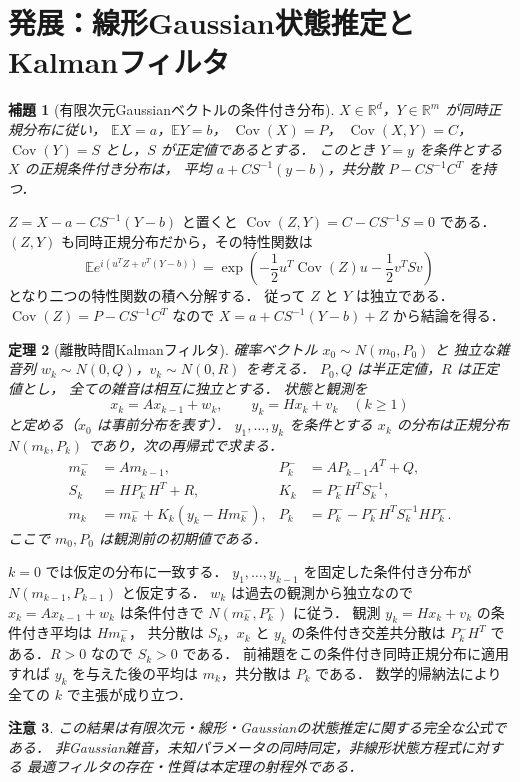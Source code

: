 \documentclass[a5paper,10pt,onecolumn]{jsarticle}
\makeatletter
\theoremstyle{mathnotetheorem}
\newtheorem{theorem}{定理}[section]
\newtheorem{lemma}[theorem]{補題}
\newtheorem{remark}[theorem]{注意}
\renewcommand{\proofname}{証明}
\renewenvironment{proof}[1][\proofname]{%
  \par\pushQED{\qed}\normalfont\topsep4\p@\@plus2\p@\relax
  \trivlist\item[\hskip\labelsep\bfseries #1]\ignorespaces
}{\popQED\endtrivlist\@endpefalse}
\makeatother
\begin{document}
\section{発展：線形Gaussian状態推定とKalmanフィルタ}
\begin{lemma}[有限次元Gaussianベクトルの条件付き分布]
$X\in\mathbb R^d$，$Y\in\mathbb R^m$ が同時正規分布に従い，
$\mathbb EX=a$，$\mathbb EY=b$，
$\operatorname{Cov}(X)=P$，
$\operatorname{Cov}(X,Y)=C$，
$\operatorname{Cov}(Y)=S$ とし，$S$ が正定値であるとする．
このとき $Y=y$ を条件とする $X$ の正規条件付き分布は，
平均 $a+CS^{-1}(y-b)$，共分散 $P-CS^{-1}C^T$ を持つ．
\end{lemma}
\begin{proof}
$Z=X-a-CS^{-1}(Y-b)$ と置くと
$\operatorname{Cov}(Z,Y)=C-CS^{-1}S=0$ である．
$(Z,Y)$ も同時正規分布だから，その特性関数は
\[
 \mathbb E e^{i(u^TZ+v^T(Y-b))}
 =\exp\!\left(-\frac12u^T\operatorname{Cov}(Z)u
                 -\frac12v^TSv\right)
\]
となり二つの特性関数の積へ分解する．
従って $Z$ と $Y$ は独立である．
$\operatorname{Cov}(Z)=P-CS^{-1}C^T$ なので
$X=a+CS^{-1}(Y-b)+Z$ から結論を得る．
\end{proof}
\begin{theorem}[離散時間Kalmanフィルタ]
確率ベクトル $x_0\sim N(m_0,P_0)$ と
独立な雑音列 $w_k\sim N(0,Q)$，$v_k\sim N(0,R)$ を考える．
$P_0,Q$ は半正定値，$R$ は正定値とし，
全ての雑音は相互に独立とする．
状態と観測を
\[
 x_k=Ax_{k-1}+w_k,\qquad y_k=Hx_k+v_k
 \quad(k\ge1)
\]
と定める（$x_0$ は事前分布を表す）．
$y_1,\ldots,y_k$ を条件とする $x_k$ の分布は正規分布
$N(m_k,P_k)$ であり，次の再帰式で求まる．
\begin{align*}
 m_k^-&=Am_{k-1},&P_k^-&=AP_{k-1}A^T+Q,\\
 S_k&=HP_k^-H^T+R,&K_k&=P_k^-H^TS_k^{-1},\\
 m_k&=m_k^-+K_k(y_k-Hm_k^-),
 &P_k&=P_k^- -P_k^-H^TS_k^{-1}HP_k^-.
\end{align*}
ここで $m_0,P_0$ は観測前の初期値である．
\end{theorem}
\begin{proof}
$k=0$ では仮定の分布に一致する．
$y_1,\ldots,y_{k-1}$ を固定した条件付き分布が
$N(m_{k-1},P_{k-1})$ と仮定する．
$w_k$ は過去の観測から独立なので
$x_k=Ax_{k-1}+w_k$ は条件付きで
$N(m_k^-,P_k^-)$ に従う．
観測 $y_k=Hx_k+v_k$ の条件付き平均は $Hm_k^-$，
共分散は $S_k$，$x_k$ と $y_k$ の条件付き交差共分散は
$P_k^-H^T$ である．$R>0$ なので $S_k>0$ である．
前補題をこの条件付き同時正規分布に適用すれば
$y_k$ を与えた後の平均は $m_k$，共分散は $P_k$ である．
数学的帰納法により全ての $k$ で主張が成り立つ．
\end{proof}
\begin{remark}
この結果は有限次元・線形・Gaussianの状態推定に関する完全な公式である．
非Gaussian雑音，未知パラメータの同時同定，非線形状態方程式に対する
最適フィルタの存在・性質は本定理の射程外である．
\end{remark}
\end{document}
